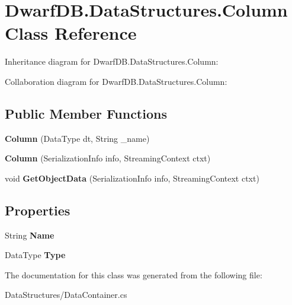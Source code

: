 \hypertarget{class_dwarf_d_b_1_1_data_structures_1_1_column}{\section{Dwarf\+D\+B.\+Data\+Structures.\+Column Class Reference}
\label{class_dwarf_d_b_1_1_data_structures_1_1_column}
}


Inheritance diagram for Dwarf\+D\+B.\+Data\+Structures.\+Column\+:


Collaboration diagram for Dwarf\+D\+B.\+Data\+Structures.\+Column\+:
\subsection*{Public Member Functions}
\begin{DoxyCompactItemize}
\item 
\hypertarget{class_dwarf_d_b_1_1_data_structures_1_1_column_af9e9d7c5a614be62d356217d07b75923}{{\bfseries Column} (Data\+Type dt, String \+\_\+name)}\label{class_dwarf_d_b_1_1_data_structures_1_1_column_af9e9d7c5a614be62d356217d07b75923}

\item 
\hypertarget{class_dwarf_d_b_1_1_data_structures_1_1_column_abf5e30f6b3e6c498f0a66d02f7f17214}{{\bfseries Column} (Serialization\+Info info, Streaming\+Context ctxt)}\label{class_dwarf_d_b_1_1_data_structures_1_1_column_abf5e30f6b3e6c498f0a66d02f7f17214}

\item 
\hypertarget{class_dwarf_d_b_1_1_data_structures_1_1_column_a4a4dd5bdf12ad2ab575b62f5a4315d17}{void {\bfseries Get\+Object\+Data} (Serialization\+Info info, Streaming\+Context ctxt)}\label{class_dwarf_d_b_1_1_data_structures_1_1_column_a4a4dd5bdf12ad2ab575b62f5a4315d17}

\end{DoxyCompactItemize}
\subsection*{Properties}
\begin{DoxyCompactItemize}
\item 
\hypertarget{class_dwarf_d_b_1_1_data_structures_1_1_column_a731a4e7a643fd90916b3e54fe5712e9f}{String {\bfseries Name}}\label{class_dwarf_d_b_1_1_data_structures_1_1_column_a731a4e7a643fd90916b3e54fe5712e9f}

\item 
\hypertarget{class_dwarf_d_b_1_1_data_structures_1_1_column_a5221d8051286c8cddc890ab614d8580a}{Data\+Type {\bfseries Type}}\label{class_dwarf_d_b_1_1_data_structures_1_1_column_a5221d8051286c8cddc890ab614d8580a}

\end{DoxyCompactItemize}


The documentation for this class was generated from the following file\+:\begin{DoxyCompactItemize}
\item 
Data\+Structures/Data\+Container.\+cs\end{DoxyCompactItemize}
